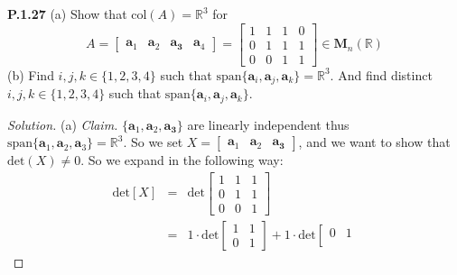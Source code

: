 \documentclass[12pt]{amsart}
\newenvironment{solution}
{\begin{proof}[Solution]}
{\end{proof}}
\begin{document}
\begin{onehalfspace}
        \noindent\textbf{P.1.27} (a) Show that $\text{col}(A) = \mathbb{R}^3$ for
        \begin{displaymath}
            A = [\begin{matrix}\mathbf{a}_1 & \mathbf{a}_2 & \mathbf{a_3} & \mathbf{a}_4\end{matrix}] =
            \left[\begin{matrix}
                      1 & 1 & 1 & 0 \\
                      0 & 1 & 1 & 1 \\
                      0 & 0 & 1 & 1
            \end{matrix}\right] \in \mathbf{M}_n(\mathbb{R})
        \end{displaymath}
        (b) Find $i,j,k \in \{1, 2, 3, 4\}$ such that $\text{span}\{\mathbf{a}_i, \mathbf{a}_j, \mathbf{a}_k\}=\mathbb{R}^3$. And
        find distinct $i,j,k\in\{1, 2, 3, 4\}$ such that $\text{span}\{\mathbf{a}_i, \mathbf{a}_j, \mathbf{a}_k\}$.
        \begin{solution}
            (a) \emph{Claim.} $\{\mathbf{a}_1, \mathbf{a}_2, \mathbf{a_3}\}$ are linearly independent thus
            $\text{span}\{\mathbf{a}_1, \mathbf{a}_2, \mathbf{a}_3\}=\mathbb{R}^3$. So we set
            $X = [\begin{matrix}\mathbf{a}_1 & \mathbf{a}_2 & \mathbf{a_3}\end{matrix}]$, and we want to show that
            $\text{det}(X)\neq 0$. So we expand in the following way:
            \begin{eqnarray*}
                \text{det}[X] & = &
                \text{det}\left[\begin{matrix}
                                    1 & 1 & 1 \\
                                    0 & 1 & 1 \\
                                    0 & 0 & 1
                \end{matrix}\right] \\
                & = & 1\cdot\text{det}\left[\begin{matrix}
                                                1 & 1\\
                                                0 & 1
                \end{matrix}\right] +
                1\cdot\text{det}\left[\begin{matrix}
                                          0 & 1\\

\end{matrix}
\end{eqnarray*}
\end{solution}
\end{onehalfspace}
\end{document}
